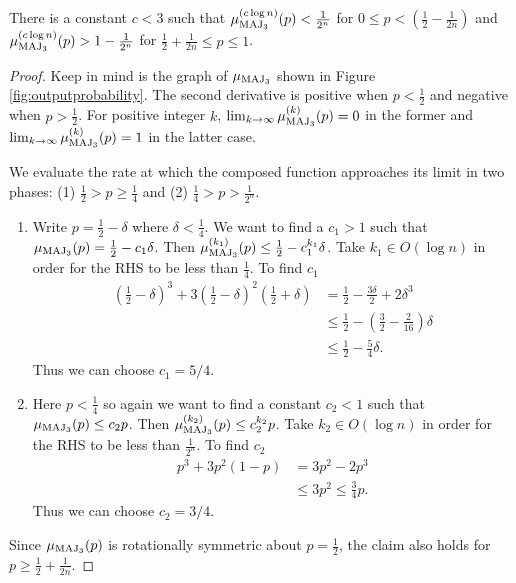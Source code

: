 \documentclass[11pt]{article}
\begin{document}
		\begin{lemma}
			\label{lem:MAJ3Bd-Outputprobability}
			There is a constant $c < 3$ such that $\mu_{\mathrm{MAJ}_3}^{(c\log n)}(p) < \frac{1}{2^n}$ for $0 \leq p < \left(\frac{1}{2} - \frac{1}{2n}\right)$ and $\mu_{\mathrm{MAJ}_3}^{(c\log n)}(p) > 1 -  \frac{1}{2^n}$ for $\frac{1}{2} + \frac{1}{2n} \leq p \leq 1$.
		\end{lemma}
		\begin{proof}
			Keep in mind is the graph of $\mu_{\mathrm{MAJ}_3}$ shown in Figure \ref{fig:outputprobability}. The second derivative is positive when $p < \frac{1}{2}$ and negative when $p > \frac{1}{2}$. For positive integer $k$, $\lim_{k \rightarrow \infty} \mu_{\mathrm{MAJ}_3}^{(k)}(p) = 0$ in the former and $\lim_{k \rightarrow \infty}\mu_{\mathrm{MAJ}_3}^{(k)}(p) = 1$ in the latter case.
 
			
			We evaluate the rate at which the composed function approaches its limit in two phases: (1) $\frac{1}{2} > p \geq \frac{1}{4}$ and (2) $\frac{1}{4} > p > \frac{1}{2^n}$. 
			\begin{enumerate}
				\item Write $p = \frac{1}{2} - \delta$ where $\delta < \frac{1}{4}$. We want to find a $c_1 > 1$ such that $\mu_{\mathrm{MAJ}_3}(p) = \frac{1}{2} - c_1\delta$. Then $\mu^{(k_1)}_{\mathrm{MAJ}_3}(p) \leq \frac{1}{2} - c^{k_1}_1\delta$. Take $k_1 \in O(\log n)$ in order for the RHS to be less than $\frac{1}{4}$. To find $c_1$
				\begin{align*}
				\left(\frac{1}{2} - \delta\right)^3 + 3\left(\frac{1}{2} - \delta\right)^2\left(\frac{1}{2} + \delta\right) &= \frac{1}{2} - \frac{3\delta}{2} + 2\delta^3\\
				&\leq \frac{1}{2} - \left(\frac{3}{2} - \frac{2}{16}\right) \delta \\
				&\leq \frac{1}{2} - \frac{5}{4} \delta.
				\end{align*}
				Thus we can choose $c_1 = 5/4$. 
				\item Here $p < \frac{1}{4}$ so again we want to find a constant $c_2 < 1$ such that $\mu_{\mathrm{MAJ}_3}(p) \leq c_2 p$. Then $\mu^{(k_2)}_{\mathrm{MAJ}_3}(p) \leq c^{k_2}_2p$. Take $k_2 \in O(\log n)$ in order for the RHS to be less than $\frac{1}{2^n}$. To find $c_2$
				\begin{align*}
					p^3 + 3p^2(1-p) &= 3p^2 - 2p^3\\
									&\leq 3p^2 \leq \frac{3}{4}p.
				\end{align*}
				Thus we can choose $c_2 = 3/4$.
			\end{enumerate}
		Since $\mu_{\mathrm{MAJ}_3}(p)$ is rotationally symmetric about $p = \frac{1}{2}$, the claim also holds for $p \geq \frac{1}{2} + \frac{1}{2n}$. 
		\end{proof}
		
\end{document}

